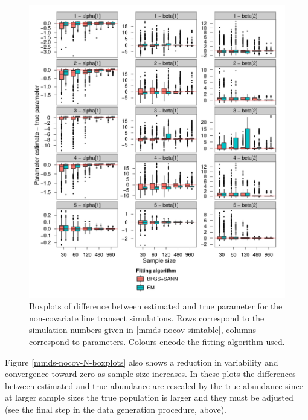 \begin{figure}
\centering
\includegraphics[width=7in]{mix/figs/nocov-boxplots.pdf}
\caption{Boxplots of difference between estimated and true parameter for the non-covariate line transect simulations. Rows correspond to the simulation numbers given in \ref{mmds-nocov-simtable}, columns correspond to parameters. Colours encode the fitting algorithm used.}
\label{mmds-nocov-boxplots}
\end{figure}

Figure \ref{mmds-nocov-N-boxplots} also shows a reduction in variability and convergence toward zero as sample size increases. In these plots the differences between estimated and true abundance are rescaled by the true abundance since at larger sample sizes the true population is larger and they must be adjusted (see the final step in the data generation procedure, above). 

